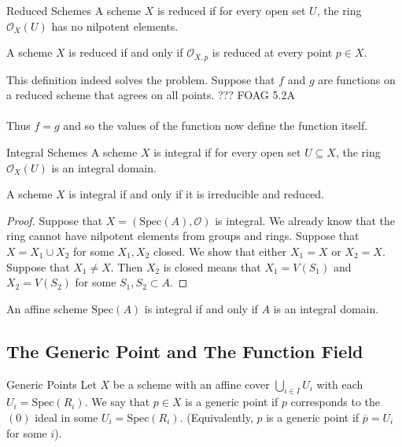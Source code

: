 \documentclass[a4paper]{article}
\begin{document}
\begin{defn}{Reduced Schemes}{} A scheme $X$ is reduced if for every open set $U$, the ring $\mathcal{O}_X(U)$ has no nilpotent elements. 
\end{defn}

\begin{prp}{}{} A scheme $X$ is reduced if and only if $\mathcal{O}_{X,p}$ is reduced at every point $p\in X$. 
\end{prp}

This definition indeed solves the problem. Suppose that $f$ and $g$ are functions on a reduced scheme that agrees on all points. ??? FOAG 5.2A\\~\\
Thus $f=g$ and so the values of the function now define the function itself. 

\begin{defn}{Integral Schemes}{} A scheme $X$ is integral if for every open set $U\subseteq X$, the ring $\mathcal{O}_X(U)$ is an integral domain. 
\end{defn}

\begin{prp}{}{} A scheme $X$ is integral if and only if it is irreducible and reduced. \tcbline
\begin{proof}
Suppose that $X=(\text{Spec}(A),\mathcal{O})$ is integral. We already know that the ring cannot have nilpotent elements from groups and rings. Suppose that $X=X_1\cup X_2$ for some $X_1,X_2$ closed. We show that either $X_1=X$ or $X_2=X$. Suppose that $X_1\neq X$. Then $X_2$ is closed means that $X_1=V(S_1)$ and $X_2=V(S_2)$ for some $S_1,S_2\subset A$. 
\end{proof}
\end{prp}

\begin{prp}{}{} An affine scheme $\text{Spec}(A)$ is integral if and only if $A$ is an integral domain. 
\end{prp}

\subsection{The Generic Point and The Function Field}
\begin{defn}{Generic Points}{} Let $X$ be a scheme with an affine cover $\bigcup_{i\in I}U_i$ with each $U_i=\text{Spec}(R_i)$. We say that $p\in X$ is a generic point if $p$ corresponds to the $(0)$ ideal in some $U_i=\text{Spec}(R_i)$. (Equivalently, $p$ is a generic point if $\overline{p}=U_i$ for some $i$). 
\end{defn}
\end{document}
